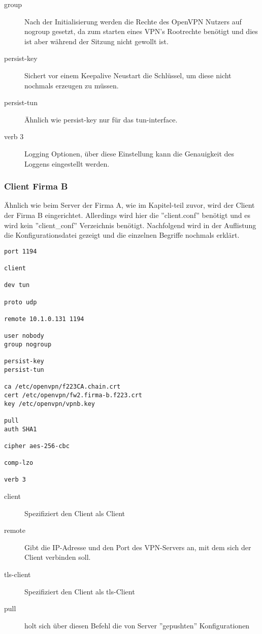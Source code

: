 \begin{description}
	\item[group]Nach der Initialisierung werden die Rechte des OpenVPN Nutzers auf nogroup gesetzt, da zum starten eines VPN's Rootrechte benötigt und dies ist aber während der Sitzung nicht gewollt ist.
	\item[persist-key] Sichert vor einem Keepalive Neustart die Schlüssel, um diese nicht nochmals erzeugen zu müssen.
	\item[persist-tun] Ähnlich wie persist-key nur für das tun-interface.  
	\item[verb 3] Logging Optionen, über diese Einstellung kann die Genauigkeit des Loggens eingestellt werden.
\end{description}

\subsubsection{Client Firma B}
Ähnlich wie beim Server der Firma A, wie im Kapitel-teil zuvor, wird der Client der Firma B eingerichtet. Allerdings wird hier die ''client.conf'' benötigt und es wird kein ''client\_conf'' Verzeichnis benötigt. Nachfolgend wird in der Auflistung  die Konfigurationsdatei gezeigt und die einzelnen Begriffe nochmals erklärt.\newline
\lstset{
	basicstyle=\footnotesize, frame=tb,
	xleftmargin=.2\textwidth, xrightmargin=.2\textwidth
}
\begin{lstlisting}[caption={client.conf Datei der Firma B},label=lst:clientconf]
port 1194

client

dev tun

proto udp

remote 10.1.0.131 1194

user nobody
group nogroup

persist-key
persist-tun

ca /etc/openvpn/f223CA.chain.crt
cert /etc/openvpn/fw2.firma-b.f223.crt
key /etc/openvpn/vpnb.key

pull
auth SHA1

cipher aes-256-cbc

comp-lzo

verb 3
\end{lstlisting}
\vspace{\baselineskip}
\begin{description}
	\item[client] Spezifiziert den Client als Client
	\item[remote] Gibt die IP-Adresse und den Port des VPN-Servers an, mit dem sich der Client verbinden soll.
	\item[tls-client] Spezifiziert den Client als tls-Client
	\item[pull] holt sich über diesen Befehl die von Server ''gepushten'' Konfigurationen
\end{description}









